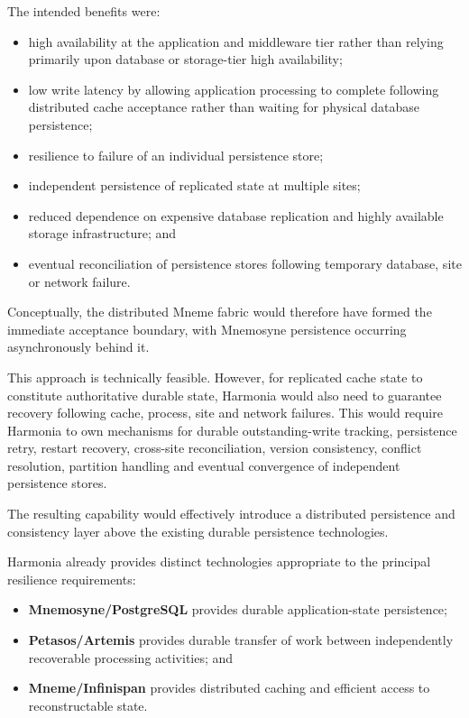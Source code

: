 The intended benefits were:
\begin{itemize}
    \item high availability at the application and middleware tier rather than relying primarily upon database or storage-tier high availability;
    \item low write latency by allowing application processing to complete following distributed cache acceptance rather than waiting for physical database persistence;
    \item resilience to failure of an individual persistence store;
    \item independent persistence of replicated state at multiple sites;
    \item reduced dependence on expensive database replication and highly available storage infrastructure; and
    \item eventual reconciliation of persistence stores following temporary database, site or network failure.
\end{itemize}

Conceptually, the distributed Mneme fabric would therefore have formed the immediate acceptance boundary, with Mnemosyne persistence occurring asynchronously behind it.

This approach is technically feasible. However, for replicated cache state to constitute authoritative durable state, Harmonia would also need to guarantee recovery following cache, process, site and network failures. This would require Harmonia to own mechanisms for durable outstanding-write tracking, persistence retry, restart recovery, cross-site reconciliation, version consistency, conflict resolution, partition handling and eventual convergence of independent persistence stores.

The resulting capability would effectively introduce a distributed persistence and consistency layer above the existing durable persistence technologies.

Harmonia already provides distinct technologies appropriate to the principal resilience requirements:
\begin{itemize}
    \item \textbf{Mnemosyne/PostgreSQL} provides durable application-state persistence;
    \item \textbf{Petasos/Artemis} provides durable transfer of work between independently recoverable processing activities; and
    \item \textbf{Mneme/Infinispan} provides distributed caching and efficient access to reconstructable state.
\end{itemize}

